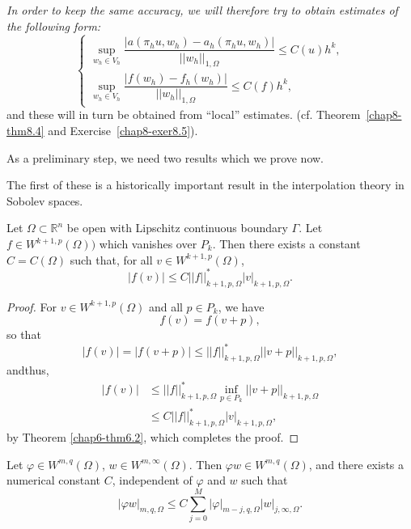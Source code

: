 {\em In order to keep the same accuracy, we will therefore try to
  obtain estimates of the following form:}
\begin{equation*}
\begin{cases}
\sup\limits_{w_{h}\in
  V_{h}}\dfrac{|a(\pi_{h}u,w_{h})-a_{h}(\pi_{h}u,w_{h})|}{||w_{h}||_{1,\Omega}}\leq
C(u)h^{k},\\
\sup\limits_{w_{h}\in
  V_{h}}\dfrac{|f(w_{h})-f_{h}(w_{h})|}{||w_{h}||_{1,\Omega}}\leq C(f)h^{k},
\end{cases}\tag{8.30}\label{chap8-eq8.30}
\end{equation*}
and these will in turn be obtained from ``local'' estimates. (cf.\@
Theorem~\ref{chap8-thm8.4} and Exercise~\ref{chap8-exer8.5}).

As a preliminary step, we need two results which we prove now.

The first of these is a historically important result in the
interpolation theory in Sobolev spaces.

\begin{theorem}\label{chap8-thm8.3}
Let $\Omega\subset \mathbb{R}^{n}$ be open with Lipschitz continuous
boundary $\Gamma$. Let $f\in W^{k+1,p}(\Omega))$ which vanishes over
$P_{k}$. Then there exists a constant $C=C(\Omega)$ such that, for all
$v\in W^{k+1,p}(\Omega)$,
\begin{equation*}
|f(v)|\leq C||f||^{*}_{k+1,p,\Omega}|v|_{k+1,p,\Omega}.\tag{8.31}
\end{equation*}
\end{theorem}

\begin{proof}
For $v\in W^{k+1,p}(\Omega)$ and all $p\in P_{k}$, we have
$$
f(v)=f(v+p),
$$
so that
$$
|f(v)|=|f(v+p)|\leq ||f||^{*}_{k+1,p,\Omega}||v+p||_{k+1,p,\Omega}, 
$$
and\pageoriginale thus,
\begin{align*}
|f(v)| &\leq ||f||^{*}_{k+1,p,\Omega}\inf\limits_{p\in
  P_{k}}||v+p||_{k+1,p,\Omega}\\
&\leq C||f||^{*}_{k+1,p,\Omega}|v|_{k+1,p,\Omega},
\end{align*}
by Theorem \ref{chap6-thm6.2}, which completes the proof.
\end{proof}

\begin{lemma}\label{chap8-lem8.1}
Let $\varphi\in W^{m,q}(\Omega)$, $w\in W^{m,\infty}(\Omega)$. Then
$\varphi w\in W^{m,q}(\Omega)$, and there exists a numerical constant
$C$, independent of $\varphi$ and $w$ such that 
\begin{equation*}
|\varphi w|_{m,q,\Omega}\leq
C\sum^{M}_{j=0}|\varphi|_{m-j,q,\Omega}|w|_{j,\infty,\Omega}.\tag{8.32} \label{chap8-eq8.32} 
\end{equation*}
\end{lemma}

